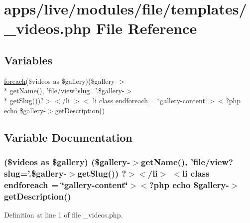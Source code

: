 \hypertarget{live_2modules_2file_2templates_2__videos_8php}{\section{apps/live/modules/file/templates/\-\_\-videos.php File Reference}
\label{live_2modules_2file_2templates_2__videos_8php}
}
\subsection*{Variables}
\begin{DoxyCompactItemize}
\item 
\hyperlink{presse_2modules_2news_2templates_2index_success_8php_abc56db52b2e9a59bcd5c9e45ac5cb332}{foreach}(\$videos as \$gallery)(\$gallery-\/$>$\\*
get\-Name(), 'file/view?\hyperlink{backend_2modules_2ipn_2templates_2view_success_8php_a2b7d6694be020169de3a660b1b93a40d}{slug}='.\$gallery-\/$>$\\*
get\-Slug())?$>$$<$/li $>$$<$ li \hyperlink{live_2modules_2news_2templates_2__actualitelight_8php_a185c73c6507391d1eb38c776b68ce96d}{class} \hyperlink{live_2modules_2file_2templates_2__videos_8php_ab2b1e42e113e7c347af37a574b516a10}{endforeach} = \char`\"{}gallery-\/content\char`\"{}$>$$<$?php echo \$gallery-\/$>$get\-Description()
\end{DoxyCompactItemize}


\subsection{Variable Documentation}
\hypertarget{live_2modules_2file_2templates_2__videos_8php_ab2b1e42e113e7c347af37a574b516a10}{
\subsubsection[{endforeach}]{ (\$videos as \$gallery) (\$gallery-\/$>$get\-Name(), 'file/view?{\bf slug}='.\$gallery-\/$>$get\-Slug()) ?$>$$<$/li$>$ $<$li {\bf class} endforeach = \char`\"{}gallery-\/content\char`\"{}$>$$<$?php echo \$gallery-\/$>$get\-Description()}}\label{live_2modules_2file_2templates_2__videos_8php_ab2b1e42e113e7c347af37a574b516a10}


Definition at line 1 of file \-\_\-videos.\-php.

